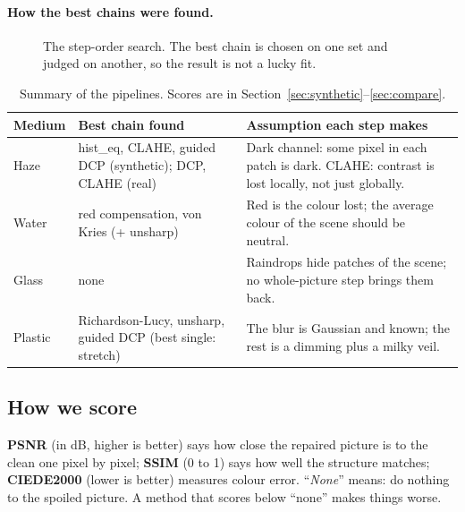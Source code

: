 \documentclass[10pt,a4paper]{article}
\begin{document}
\paragraph{How the best chains were found.}
\begin{figure}[H]\centering{}\caption{The step-order search. The best chain is chosen on one set and judged on another, so the result is not a lucky fit.}\end{figure}
\begin{table}[H]\centering\small
\begin{tabular}{p{1.5cm}p{4.6cm}p{9.2cm}}\toprule
Medium & Best chain found & Assumption each step makes\\\midrule
Haze & hist\_eq, CLAHE, guided DCP (synthetic); DCP, CLAHE (real) & Dark channel: some pixel in each patch is dark. CLAHE: contrast is lost locally, not just globally.\\
Water & red compensation, von Kries (+ unsharp) & Red is the colour lost; the average colour of the scene should be neutral.\\
Glass & none & Raindrops hide patches of the scene; no whole-picture step brings them back.\\
Plastic & Richardson-Lucy, unsharp, guided DCP (best single: stretch) & The blur is Gaussian and known; the rest is a dimming plus a milky veil.\\\bottomrule
\end{tabular}\caption{Summary of the pipelines. Scores are in Section~\ref{sec:synthetic}--\ref{sec:compare}.}\end{table}

\subsection{How we score}
\textbf{PSNR} (in dB, higher is better) says how close the repaired picture is to the clean one pixel by pixel; \textbf{SSIM} (0 to 1) says how well the structure matches; \textbf{CIEDE2000} (lower is better) measures colour error. ``\emph{None}'' means: do nothing to the spoiled picture. A method that scores below ``none'' makes things worse.
\end{document}
